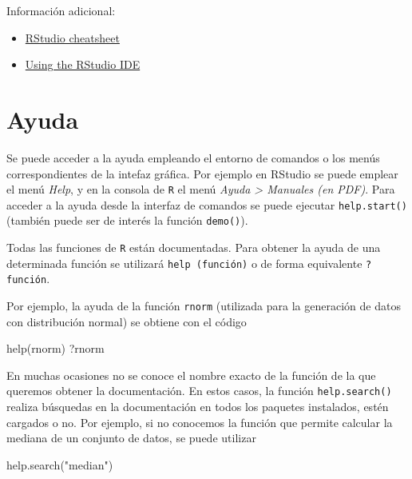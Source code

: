 \documentclass[
]{book}
\newenvironment{Shaded}{\begin{snugshade}}{\end{snugshade}}
\newcommand{\FunctionTok}[1]{\textcolor[rgb]{0.00,0.00,0.00}{#1}}
\newcommand{\NormalTok}[1]{#1}
\newcommand{\StringTok}[1]{\textcolor[rgb]{0.31,0.60,0.02}{#1}}
\theoremstyle{break}
\theoremstyle{nonumberplain}
\begin{document}
Información adicional:

\begin{itemize}
\item
  \href{https://posit.co/wp-content/uploads/2022/10/rstudio-ide-1.pdf}{RStudio cheatsheet}
\item
  \href{https://support.posit.co/hc/en-us/sections/200107586-Using-the-RStudio-IDE}{Using the RStudio IDE}
\end{itemize}

\hypertarget{ayuda}{%
\section{Ayuda}\label{ayuda}}

Se puede acceder a la ayuda empleando el entorno de comandos o los menús correspondientes de la intefaz gráfica.
Por ejemplo en RStudio se puede emplear el menú \emph{Help}, y en la consola de \texttt{R} el menú \emph{Ayuda \textgreater{} Manuales (en PDF)}.
Para acceder a la ayuda desde la interfaz de comandos se puede ejecutar \texttt{help.start()} (también puede ser de interés la función \texttt{demo()}).

Todas las funciones de \texttt{R} están documentadas.
Para obtener la ayuda de una determinada función se utilizará \texttt{help\ (función)} o de forma equivalente \texttt{?función}.

Por ejemplo, la ayuda de la función \texttt{rnorm} (utilizada para la
generación de datos con distribución normal) se obtiene con el código

\begin{Shaded}
\begin{Highlighting}[]
\FunctionTok{help}\NormalTok{(rnorm)}
\NormalTok{?rnorm}
\end{Highlighting}
\end{Shaded}

En muchas ocasiones no se conoce el nombre exacto de la función de la
que queremos obtener la documentación. En estos casos, la función
\texttt{help.search()} realiza búsquedas en la documentación en todos los
paquetes instalados, estén cargados o no.
Por ejemplo, si no conocemos la función que permite calcular la mediana de un conjunto de datos, se puede utilizar

\begin{Shaded}
\begin{Highlighting}[]
\FunctionTok{help.search}\NormalTok{(}\StringTok{"median"}\NormalTok{)}
\end{Highlighting}
\end{Shaded}
\end{document}
